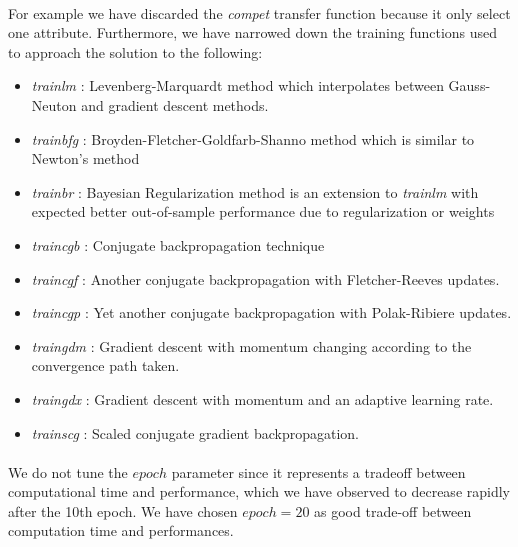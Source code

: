 \documentclass[a4paper,12pt,oneside,final]{report}
\begin{document}
\paragraph{}
For example we have discarded the \textit{compet} transfer function because it only select one attribute. Furthermore, we have narrowed down the training functions used to approach the solution to the following:
\begin{itemize}
\item \textit{trainlm} : Levenberg-Marquardt method which interpolates between Gauss-Neuton and gradient descent methods.
\item \textit{trainbfg} : Broyden-Fletcher-Goldfarb-Shanno method which is similar to Newton's method
\item \textit{trainbr} : Bayesian Regularization method is an extension to \textit{trainlm} with expected better out-of-sample performance due to regularization or weights
\item\textit{traincgb} : Conjugate backpropagation technique
\item \textit{traincgf} : Another conjugate backpropagation with Fletcher-Reeves updates. 
\item \textit{traincgp} : Yet another conjugate backpropagation with Polak-Ribiere updates.
\item \textit{traingdm} : Gradient descent with momentum changing according to the convergence path taken.
\item \textit{traingdx} : Gradient descent with momentum and an adaptive learning rate.
\item \textit{trainscg} : Scaled conjugate gradient backpropagation.
\end{itemize}
\paragraph{}
We do not tune the $epoch$ parameter since it represents a tradeoff between computational time and performance, which we have observed to decrease rapidly after the 10th epoch.  We have chosen $epoch=20$ as good trade-off between computation time and performances.
\end{document}
